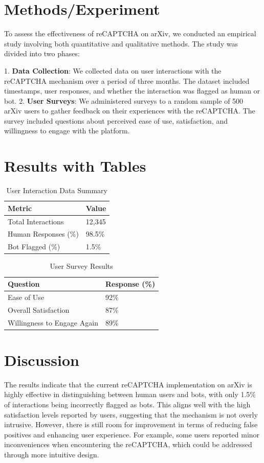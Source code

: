 \documentclass{article}
\begin{document}
\section{Methods/Experiment}
To assess the effectiveness of reCAPTCHA on arXiv, we conducted an empirical study involving both quantitative and qualitative methods. The study was divided into two phases:

1. \textbf{Data Collection}: We collected data on user interactions with the reCAPTCHA mechanism over a period of three months. The dataset included timestamps, user responses, and whether the interaction was flagged as human or bot.
2. \textbf{User Surveys}: We administered surveys to a random sample of 500 arXiv users to gather feedback on their experiences with the reCAPTCHA. The survey included questions about perceived ease of use, satisfaction, and willingness to engage with the platform.

\section{Results with Tables}
\begin{table}[ht]
\centering
\caption{User Interaction Data Summary}
\label{tab:interaction_summary}
\begin{tabular}{@{}ll@{}}
\toprule
Metric & Value \\ \midrule
Total Interactions & 12,345 \\
Human Responses (\%) & 98.5\% \\
Bot Flagged (\%) & 1.5\% \\ \bottomrule
\end{tabular}
\end{table}

\begin{table}[ht]
\centering
\caption{User Survey Results}
\label{tab:survey_results}
\begin{tabular}{@{}ll@{}}
\toprule
Question & Response (\%) \\ \midrule
Ease of Use & 92\% \\
Overall Satisfaction & 87\% \\
Willingness to Engage Again & 89\% \\ \bottomrule
\end{tabular}
\end{table}

\section{Discussion}
The results indicate that the current reCAPTCHA implementation on arXiv is highly effective in distinguishing between human users and bots, with only 1.5\% of interactions being incorrectly flagged as bots. This aligns well with the high satisfaction levels reported by users, suggesting that the mechanism is not overly intrusive. However, there is still room for improvement in terms of reducing false positives and enhancing user experience. For example, some users reported minor inconveniences when encountering the reCAPTCHA, which could be addressed through more intuitive design.
\end{document}
